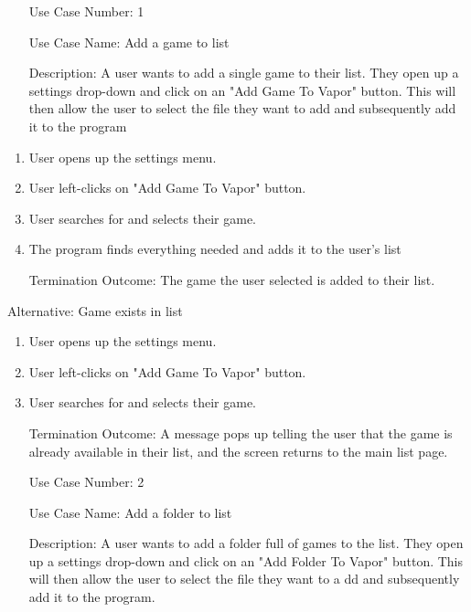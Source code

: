 \documentclass[10pt,conference,onecolumn,compsoc]{IEEEtran}
\begin{document}
\begin{itemize}
\item[Use Case Number:] 1
\item[Use Case Name:] Add a game to list
\item[Description:] A user wants to add a single game to their list. They open up a settings drop-down and click on an "Add Game To Vapor" button. This will then allow the user to select the file they want to add and subsequently add it to the program
\end{itemize}
%
%
\begin{enumerate}
\item User opens up the settings menu.
\item User left-clicks on "Add Game To Vapor" button.
\item User searches for and selects their game.
\item The program finds everything needed and adds it to the user's list
\item[Termination Outcome:] The game the user selected is added to their list.
\end{enumerate}
%
%
Alternative: Game exists in list
\begin{enumerate}
\item User opens up the settings menu.
\item User left-clicks on "Add Game To Vapor" button.
\item User searches for and selects their game.
\item [Termination Outcome:] A message pops up telling the user that the game is already available in their list, and the screen returns to the main list page.
\end{enumerate}
%
%
%
\begin{itemize}
\item[Use Case Number:] 2
\item[Use Case Name:] Add a folder to list
\item[Description:] A user wants to add a folder full of games to the list. They open up a settings drop-down and click on an "Add Folder To Vapor" button. This will then allow the user to select the file they want to a dd and subsequently add it to the program.
\end{itemize}
\end{document}
